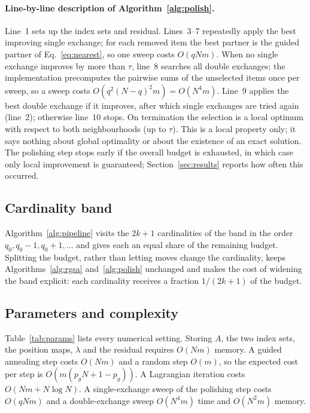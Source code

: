 \documentclass[pdflatex,sn-mathphys-num]{sn-jnl}
\theoremstyle{thmstyleone}
\theoremstyle{thmstylethree}
\begin{document}
\paragraph{Line-by-line description of Algorithm~\ref{alg:polish}.}
Line~1 sets up the index sets and residual. Lines~3--7 repeatedly apply the best improving single exchange; for each removed item the best partner is the guided partner of Eq.~\eqref{eq:nearest}, so one sweep costs $O(qNm)$. When no single exchange improves by more than $\tau$, line~8 searches all double exchanges; the implementation precomputes the pairwise sums of the unselected items once per sweep, so a sweep costs $O(q^2(N-q)^2m)=O(N^4m)$. Line~9 applies the best double exchange if it improves, after which single exchanges are tried again (line~2); otherwise line~10 stops. On termination the selection is a local optimum with respect to both neighbourhoods (up to $\tau$). This is a local property only; it says nothing about global optimality or about the existence of an exact solution. The polishing step stops early if the overall budget is exhausted, in which case only local improvement is guaranteed; Section~\ref{sec:results} reports how often this occurred.

\subsection{Cardinality band}\label{sec:band}
Algorithm~\ref{alg:pipeline} visits the $2k+1$ cardinalities of the band in the order $q_0,q_0-1,q_0+1,\dots$ and gives each an equal share of the remaining budget. Splitting the budget, rather than letting moves change the cardinality, keeps Algorithms~\ref{alg:rgsa} and~\ref{alg:polish} unchanged and makes the cost of widening the band explicit: each cardinality receives a fraction $1/(2k+1)$ of the budget.

\subsection{Parameters and complexity}
Table~\ref{tab:params} lists every numerical setting. Storing $A$, the two index sets, the position maps, $\lambda$ and the residual requires $O(Nm)$ memory. A guided annealing step costs $O(Nm)$ and a random step $O(m)$, so the expected cost per step is $O(m(p_gN+1-p_g))$. A Lagrangian iteration costs $O(Nm+N\log N)$. A single-exchange sweep of the polishing step costs $O(qNm)$ and a double-exchange sweep $O(N^4m)$ time and $O(N^2m)$ memory.
\end{document}
